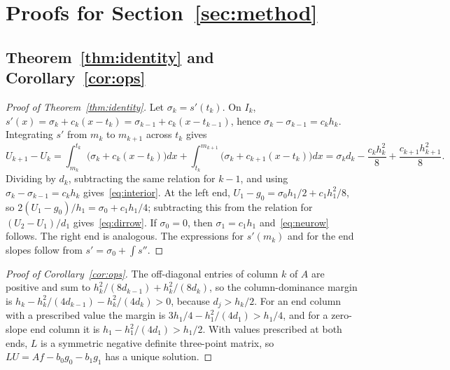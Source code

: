 \documentclass[preprint,12pt]{elsarticle}
\theoremstyle{remark}
\begin{document}
\clearpage
\appendix
\section{Proofs for Section~\ref{sec:method}}\label{app:ops}
\subsection{Theorem~\ref{thm:identity} and Corollary~\ref{cor:ops}}\label{app:identity}
\begin{proof}[Proof of Theorem~\ref{thm:identity}]
Let $\sigma_k=s'(t_k)$. On $I_k$, $s'(x)=\sigma_k+c_k(x-t_k)=\sigma_{k-1}+c_k(x-t_{k-1})$, hence
$\sigma_k-\sigma_{k-1}=c_kh_k$. Integrating $s'$ from $m_k$ to $m_{k+1}$ across $t_k$ gives
\[
U_{k+1}-U_k=\int_{m_k}^{t_k}\!\big(\sigma_k+c_k(x-t_k)\big)dx+\int_{t_k}^{m_{k+1}}\!\big(\sigma_k+c_{k+1}(x-t_k)\big)dx
=\sigma_kd_k-\frac{c_kh_k^2}{8}+\frac{c_{k+1}h_{k+1}^2}{8}.
\]
Dividing by $d_k$, subtracting the same relation for $k-1$, and using $\sigma_k-\sigma_{k-1}=c_kh_k$
gives~\eqref{eq:interior}. At the left end, $U_1-g_0=\sigma_0h_1/2+c_1h_1^2/8$, so
$2(U_1-g_0)/h_1=\sigma_0+c_1h_1/4$; subtracting this from the relation for $(U_2-U_1)/d_1$
gives~\eqref{eq:dirrow}. If $\sigma_0=0$, then $\sigma_1=c_1h_1$ and~\eqref{eq:neurow} follows. The right
end is analogous. The expressions for $s'(m_k)$ and for the end slopes follow from $s'=\sigma_0+\int s''$.
\end{proof}
\begin{proof}[Proof of Corollary~\ref{cor:ops}]
The off-diagonal entries of column $k$ of $A$ are positive and sum to $h_k^2/(8d_{k-1})+h_k^2/(8d_k)$, so
the column-dominance margin is $h_k-h_k^2/(4d_{k-1})-h_k^2/(4d_k)>0$, because $d_j>h_k/2$. For an end
column with a prescribed value the margin is $3h_1/4-h_1^2/(4d_1)>h_1/4$, and for a zero-slope end
column it is $h_1-h_1^2/(4d_1)>h_1/2$. With values prescribed at both ends, $L$ is a symmetric negative
definite three-point matrix, so $LU=Af-b_0g_0-b_1g_1$ has a unique solution.
\end{proof}
\end{document}
